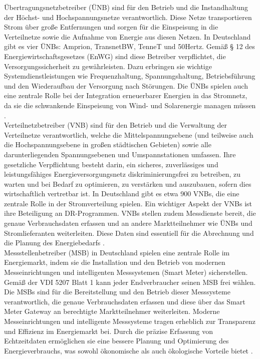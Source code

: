 Übertragungsnetzbetreiber (ÜNB) sind für den Betrieb und die Instandhaltung der Höchst- und Hochspannungsnetze verantwortlich. Diese Netze transportieren Strom über große Entfernungen und sorgen für die Einspeisung in die Verteilnetze sowie die Aufnahme von Energie aus diesen Netzen. In Deutschland gibt es vier ÜNBs: Amprion, TransnetBW, TenneT und 50Hertz. Gemäß § 12 des Energiewirtschaftsgesetzes (EnWG) sind diese Betreiber verpflichtet, die Versorgungssicherheit zu gewährleisten. Dazu erbringen sie wichtige Systemdienstleistungen wie Frequenzhaltung, Spannungshaltung, Betriebsführung und den Wiederaufbau der Versorgung nach Störungen. Die ÜNBs spielen auch eine zentrale Rolle bei der Integration erneuerbarer Energien in das Stromnetz, da sie die schwankende Einspeisung von Wind- und Solarenergie managen müssen \cite{VDI5207Blatt2020, hammonsIntegratingRenewableEnergy2008}.\\

Verteilnetzbetreiber (VNB) sind für den Betrieb und die Verwaltung der Verteilnetze verantwortlich, welche die Mittelspannungsebene (und teilweise auch die Hochspannungsebene in großen städtischen Gebieten) sowie alle darunterliegenden Spannungsebenen und Umspannstationen umfassen. Ihre gesetzliche Verpflichtung besteht darin, ein sicheres, zuverlässiges und leistungsfähiges Energieversorgungsnetz diskriminierungsfrei zu betreiben, zu warten und bei Bedarf zu optimieren, zu verstärken und auszubauen, sofern dies wirtschaftlich vertretbar ist. In Deutschland gibt es etwa 900 VNBs, die eine zentrale Rolle in der Stromverteilung spielen. Ein wichtiger Aspekt der VNBs ist ihre Beteiligung an DR-Programmen. VNBs stellen zudem Messdienste bereit, die genaue Verbrauchsdaten erfassen und an andere Marktteilnehmer wie ÜNBs und Stromlieferanten weiterleiten. Diese Daten sind essentiell für die Abrechnung und die Planung des Energiebedarfs \cite{VDI5207Blatt2020, stanelyteOverviewDemandResponseServices2022}.\\

Messstellenbetreiber (MSB) in Deutschland spielen eine zentrale Rolle im Energiemarkt, indem sie die Installation und den Betrieb von modernen Messeinrichtungen und intelligenten Messsystemen (Smart Meter) sicherstellen. Gemäß der VDI 5207 Blatt 1 \cite{VDI5207Blatt2020} kann jeder Endverbraucher seinen MSB frei wählen. Die MSBs sind für die Bereitstellung und den Betrieb dieser Messsysteme verantwortlich, die genaue Verbrauchsdaten erfassen und diese über das Smart Meter Gateway an berechtigte Marktteilnehmer weiterleiten. Moderne Messeinrichtungen und intelligente Messsysteme tragen erheblich zur Transparenz und Effizienz im Energiemarkt bei. Durch die präzise Erfassung von Echtzeitdaten ermöglichen sie eine bessere Planung und Optimierung des Energieverbrauchs, was sowohl ökonomische als auch ökologische Vorteile bietet \cite{VDI5207Blatt2020, rindSmartEnergyMeters2023}.\\

